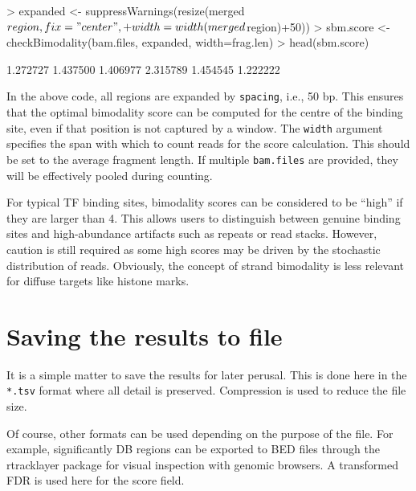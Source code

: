 \documentclass[12pt]{report}
\renewenvironment{Schunk}{\vspace{0pt}}{\vspace{0pt}}
\newcommand{\code}[1]{{\small\texttt{#1}}}
\newcommand{\rtracklayer}{rtracklayer}
\begin{document}
\begin{Schunk}
\begin{Sinput}
> expanded <- suppressWarnings(resize(merged$region, fix="center", 
+     width=width(merged$region)+50))
> sbm.score <- checkBimodality(bam.files, expanded, width=frag.len)
> head(sbm.score)
\end{Sinput}
\begin{Soutput}
[1] 1.272727 1.437500 1.406977 2.315789 1.454545 1.222222
\end{Soutput}
\end{Schunk}

In the above code, all regions are expanded by \code{spacing}, i.e., 50 bp.
This ensures that the optimal bimodality score can be computed for the centre of the binding site, even if that position is not captured by a window.
The \code{width} argument specifies the span with which to count reads for the score calculation.
This should be set to the average fragment length.
If multiple \code{bam.files} are provided, they will be effectively pooled during counting.

For typical TF binding sites, bimodality scores can be considered to be ``high'' if they are larger than 4.
This allows users to distinguish between genuine binding sites and high-abundance artifacts such as repeats or read stacks.
However, caution is still required as some high scores may be driven by the stochastic distribution of reads.
Obviously, the concept of strand bimodality is less relevant for diffuse targets like histone marks.

\section{Saving the results to file}
It is a simple matter to save the results for later perusal. 
This is done here in the \code{*.tsv} format where all detail is preserved. 
Compression is used to reduce the file size. 

\begin{Schunk}
\end{Schunk}

Of course, other formats can be used depending on the purpose of the file. 
For example, significantly DB regions can be exported to BED files through the \rtracklayer{} package for visual inspection with genomic browsers.
A transformed FDR is used here for the score field.
\end{document}

